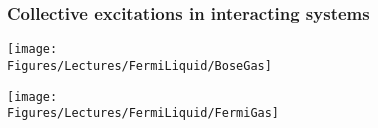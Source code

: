\begin{frame}[label=Fermiliq2]
  \frametitle{Collective excitations in interacting systems}

\centerline{\texttt{[image: \\Figures/Lectures/FermiLiquid/BoseGas]}}






\centerline{\texttt{[image: \\Figures/Lectures/FermiLiquid/FermiGas]}}



\end{frame}


